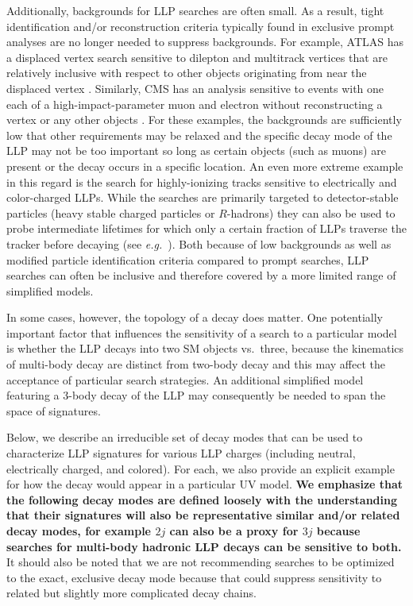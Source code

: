  Additionally,  backgrounds for LLP searches
are often small. As a result,  tight identification and/or reconstruction
criteria typically found in exclusive prompt analyses are  no longer needed to suppress
backgrounds. For example, ATLAS has a displaced vertex search
sensitive to dilepton and multitrack vertices that are relatively
inclusive with respect to other objects originating from near the displaced vertex
\cite{Aad:2015rba}. Similarly, CMS has an analysis sensitive to
events with one each of a high-impact-parameter muon and electron without reconstructing a vertex or any other objects
\cite{CMS-PAS-EXO-16-022}. For these examples, the backgrounds are sufficiently low that other requirements may be relaxed and the specific decay mode of the LLP may not be too important so long as certain objects (such as muons) are present or the decay occurs in a specific location. An even more extreme example in this regard is the search for highly-ionizing tracks sensitive to electrically and color-charged LLPs. While the searches are primarily targeted to detector-stable particles (heavy stable charged particles or $R$-hadrons) they can also be used to probe intermediate lifetimes for which only a certain fraction of LLPs traverse the tracker before decaying (see \emph{e.g.}~\cite{Garny:2017rxs}). Both because of low backgrounds as well as modified particle identification criteria compared to prompt searches, LLP searches can often be inclusive and therefore covered by a more limited range of simplified models.

In some cases, however, the topology of a decay does matter. One potentially important factor
 that influences the sensitivity of a search to a particular model is whether
 the LLP decays into two SM objects vs.~three, because the kinematics of multi-body
decay are distinct from two-body decay and this may affect the 
acceptance of particular search strategies.  An additional simplified model 
  featuring a 3-body decay of the LLP may consequently be needed to span
  the space of signatures.
  
Below, we describe an irreducible set of decay modes that can be used to
characterize LLP signatures for various LLP charges (including neutral, electrically charged, and colored). For each, we also provide an explicit example for how the decay would appear in a particular UV model. {\bf We  emphasize that the following decay modes are defined
  loosely with the understanding that their signatures will also be representative similar and/or related decay modes, for example
  $2j$ can also be a proxy for $3j$ because searches for
  multi-body hadronic LLP decays can be sensitive to both.} It
should also be noted that we are not recommending searches to be
optimized to the exact, exclusive decay mode because that could
suppress sensitivity to related but slightly more complicated decay chains.


